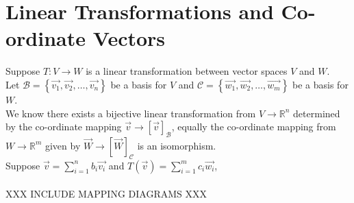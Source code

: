 \documentclass{report}
\begin{document}
  \section{Linear Transformations and Co-ordinate Vectors}
 Suppose $ T: V \to W$ is a linear transformation between vector spaces $ V$ and $ W$.\\
  Let $ \mathcal{B} = \left\{ \vec{ v_1} , \vec{ v_2} , \ldots , \vec{ v_n}  \right\}$ be a basis for $ V$ and $ \mathcal{C} = \left\{ \vec{ w_1} , \vec{ w_2} , \ldots , \vec{ w_m}  \right\}$ be a basis for $ W$.\\
  We know there exists a bijective linear transformation from $ V \to \mathbb{R} ^{n}$ determined by the co-ordinate mapping $ \vec{ v} \to \left[ \vec{ v}  \right] _{ \mathcal{B}}$, equally the co-ordinate mapping  from $ W \to \mathbb{R} ^{m}$ given by $ \vec{ W} \to \left[ \vec{ W}  \right] _{ \mathcal{C}}$ is an isomorphism.\\
   Suppose $ \vec{ v} = \sum\limits_{i=1}^{n} b_i \vec{ v_i}$ and     $ T \left( \vec{ v}  \right) = \sum\limits_{i=1}^{m} c_i \vec{ w_i}$,\\
   \\




     XXX INCLUDE MAPPING DIAGRAMS XXX\\
\end{document}
